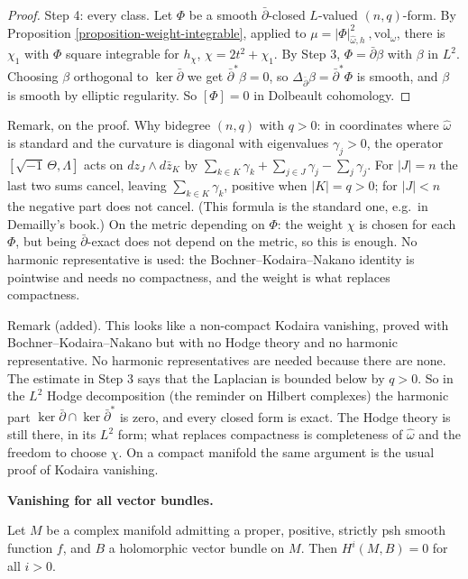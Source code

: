 \begin{proof}
Step 4: every class. Let $\Phi$ be a smooth
$\bar\partial$-closed $L$-valued
$(n,q)$-form. By Proposition
\ref{proposition-weight-integrable}, applied
to
$\mu=|\Phi|^2_{\hat\omega,h}\
,\mathrm{vol}_{\hat\omega}$,
there is $\chi_1$ with $\Phi$ square
integrable for $h_\chi$, $\chi=2t^2+\chi_1$.
By Step 3, $\Phi=\bar\partial\beta$ with
$\beta$ in $L^2$. Choosing $\beta$ orthogonal
to $\ker\bar\partial$ we get
$\bar\partial^*\beta=0$, so
$\Delta_{\bar\partial}\beta
=\bar\partial^*\Phi$
is smooth, and $\beta$ is smooth by elliptic
regularity. So $[\Phi]=0$ in Dolbeault
cohomology.
\end{proof}

\noindent
Remark, on the proof. Why bidegree $(n,q)$
with $q>0$: in coordinates where $\hat\omega$
is standard and the curvature is diagonal
with eigenvalues $\gamma_j>0$, the operator
$[\sqrt{-1}\,\Theta,\Lambda]$ acts on
$dz_J\wedge d\bar z_K$ by $\sum_{k\in
K}\gamma_k+\sum_{j\in
J}\gamma_j-\sum_j\gamma_j$. For $|J|=n$ the
last two sums cancel, leaving $\sum_{k\in
K}\gamma_k$, positive when $|K|=q>0$; for
$|J|<n$ the negative part does not cancel.
(This formula is the standard one, e.g.\ in
Demailly's book.) On the metric depending on
$\Phi$: the weight $\chi$ is chosen for each
$\Phi$, but being $\bar\partial$-exact does
not depend on the metric, so this is enough.
No harmonic representative is used: the
Bochner--Kodaira--Nakano
identity is pointwise and needs no
compactness, and the weight is what replaces
compactness.

\noindent
Remark (added). This looks like a
non-compact Kodaira vanishing, proved with
Bochner--Kodaira--Nakano but with no Hodge
theory and no harmonic representative. No
harmonic representatives are
needed because there are none. The estimate
in Step 3 says that the Laplacian is bounded
below by $q>0$. So in the $L^2$ Hodge
decomposition (the reminder on Hilbert
complexes) the harmonic part
$\ker\bar\partial\cap\ker\bar\partial^*$ is
zero, and every closed form is exact. The
Hodge theory is still there, in its $L^2$
form; what replaces compactness is
completeness of $\hat\omega$ and the freedom
to choose $\chi$. On a compact manifold the
same argument is the usual proof of Kodaira
vanishing.

\medskip\noindent
{\bf Vanishing for all vector bundles.}

\begin{theorem}
\label{theorem-vanishing-proper-spsh}
Let $M$ be a complex manifold admitting a
proper, positive, strictly psh smooth
function $f$, and $B$ a holomorphic vector
bundle on $M$. Then $H^i(M,B)=0$ for all
$i>0$.
\end{theorem}

